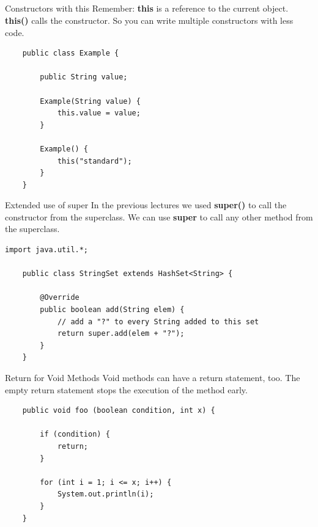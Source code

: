 \subsection{}
\begin{frame}[fragile]{Constructors with this}
	Remember: \textbf{this} is a reference to the current object.
	\vfill
	\textbf{this()} calls the constructor. 
	So you can write multiple constructors with less code.
	\begin{lstlisting}
	public class Example {
	
	    public String value;
	
	    Example(String value) {
	        this.value = value;
	    }
	
	    Example() {
	        this("standard");	    
	    }
	}
	\end{lstlisting}
\end{frame}

\begin{frame}[fragile]{Extended use of super}
	In the previous lectures we used \textbf{super()} to call the constructor from the superclass.
	We can use \textbf{super} to call any other method from the superclass.
	\begin{lstlisting}[escapechar=!]
	import java.util.*;

	public class StringSet extends HashSet<String> {
	
	    @Override
	    public boolean add(String elem) {
	        // add a "?" to every String added to this set
	        return super.add(elem + "?");
	    }
	}
	\end{lstlisting}
\end{frame}

\begin{frame}[fragile]{Return for Void Methods}
	Void methods can have a return statement, too. 
	The empty return statement stops the execution of the method early.
	\begin{lstlisting}
	public void foo (boolean condition, int x) {
	
	    if (condition) {
	        return;
	    }
	    
	    for (int i = 1; i <= x; i++) {
	        System.out.println(i);
	    }
	}
	\end{lstlisting}
\end{frame}

